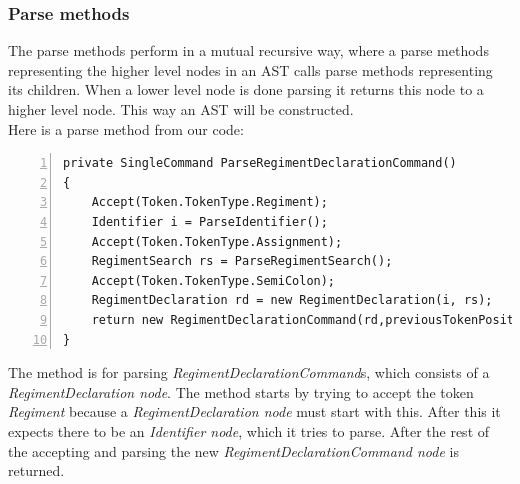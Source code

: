		\subsubsection{Parse methods}
			\label{parsemethods}
			The parse methods perform in a mutual recursive way, where a parse methods representing the higher level nodes in an 
			AST calls parse methods representing its children. When a lower level node is done parsing it returns this node to a higher level node. This way an AST will be constructed. \\
			Here is a parse method from our code:
			\begin{lstlisting}[basicstyle=\small\sffamily,
					keywords={break,case,const,continue,default,else,enum,
					for,if,return,switch,while,do,long,void,int,float,double,
					char,struct,typedef,include,size\_t},
					keywordstyle={\color{blue}},
					comment={[l]{//}}, morecomment={[s]{/*}{*/}}, commentstyle=\itshape,
					columns={[l]flexible}, numbers=left, numberstyle=\tiny,
					frameround=fftt, frame=shadowbox, captionpos=b,
					caption={Parse method for RegimentDeclarationCommand},
					label=impl:regdeccmd]
private SingleCommand ParseRegimentDeclarationCommand()
{
    Accept(Token.TokenType.Regiment);
 	Identifier i = ParseIdentifier();
  	Accept(Token.TokenType.Assignment);
    RegimentSearch rs = ParseRegimentSearch();
    Accept(Token.TokenType.SemiColon);
	RegimentDeclaration rd = new RegimentDeclaration(i, rs);
	return new RegimentDeclarationCommand(rd,previousTokenPosition);
}
			\end{lstlisting}
			The method is for parsing {\it RegimentDeclarationCommand}s, which consists of a {\it RegimentDeclaration node}.
			The method starts by trying to accept the token {\it Regiment} because a {\it RegimentDeclaration node} must start with this. 
			After this it expects there to be an {\it Identifier node}, which it tries to parse. After the rest of the accepting and parsing the new 
			{\it RegimentDeclarationCommand node} is returned.
		
		